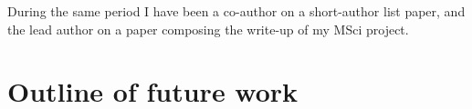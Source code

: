 \documentclass{kentigern}
\begin{document}
During the same period I have been a co-author on a short-author list
paper, and the lead author on a paper composing the write-up of my
MSci project.

\part{Outline of future work}
\label{part:future}






\glsaddall
\printglossaries
\end{document}
